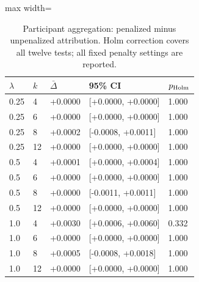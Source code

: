 \begin{table}[htbp]
\centering\small
\caption{Participant aggregation: penalized minus unpenalized attribution. Holm correction covers all twelve tests; all fixed penalty settings are reported.}\label{tab:penalty}
\begin{adjustbox}{max width=\textwidth}
\begin{tabular}{lllll}\toprule
$\lambda$ & $k$ & $\bar\Delta$ & 95\% CI & $p_{\rm Holm}$\\\midrule
0.25 & 4 & +0.0000 & [+0.0000, +0.0000] & 1.000\\
0.25 & 6 & +0.0000 & [+0.0000, +0.0000] & 1.000\\
0.25 & 8 & +0.0002 & [-0.0008, +0.0011] & 1.000\\
0.25 & 12 & +0.0000 & [+0.0000, +0.0000] & 1.000\\
0.5 & 4 & +0.0001 & [+0.0000, +0.0004] & 1.000\\
0.5 & 6 & +0.0000 & [+0.0000, +0.0000] & 1.000\\
0.5 & 8 & +0.0000 & [-0.0011, +0.0011] & 1.000\\
0.5 & 12 & +0.0000 & [+0.0000, +0.0000] & 1.000\\
1.0 & 4 & +0.0030 & [+0.0006, +0.0060] & 0.332\\
1.0 & 6 & +0.0000 & [+0.0000, +0.0000] & 1.000\\
1.0 & 8 & +0.0005 & [-0.0008, +0.0018] & 1.000\\
1.0 & 12 & +0.0000 & [+0.0000, +0.0000] & 1.000\\
\bottomrule\end{tabular}
\end{adjustbox}
\end{table}

